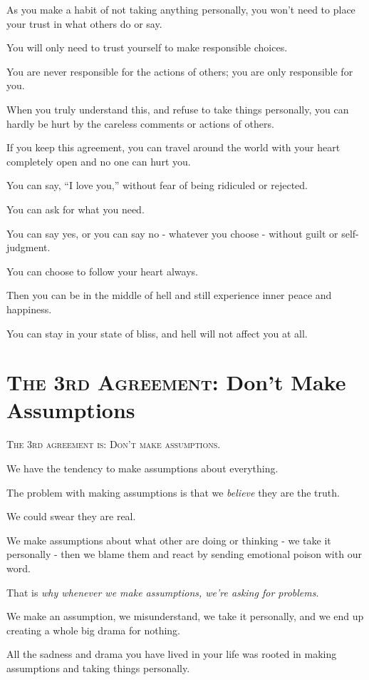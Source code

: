 \documentclass{article}
\numberwithin{equation}{section}
\begin{document}
%
As you make a habit of not taking anything personally, you won't need to place your trust in what others do or say.

You will only need to trust yourself to make responsible choices.

You are never responsible for the actions of others; you are only responsible for you.

When you truly understand this, and refuse to take things personally, you can hardly be hurt by the careless comments or actions of others.

%
If you keep this agreement, you can travel around the world with your heart completely open and no one can hurt you.

You can say, ``I love you,'' without fear of being ridiculed or rejected.

You can ask for what you need.

You can say yes, or you can say no - whatever you choose - without guilt or self-judgment.

You can choose to follow your heart always.

Then you can be in the middle of hell and still experience inner peace and happiness.

You can stay in your state of bliss, and hell will not affect you at all.

\section{\textsc{The 3rd Agreement}: Don't Make Assumptions}
\textsc{The 3rd agreement is: Don't make assumptions}.

%
We have the tendency to make assumptions about everything.

The problem with making assumptions is that we \textit{believe} they are the truth.

We could swear they are real.

We make assumptions about what other are doing or thinking - we take it personally - then we blame them and react by sending emotional poison with our word.

That is \textit{why whenever we make assumptions, we're asking for problems}.

We make an assumption, we misunderstand, we take it personally, and we end up creating a whole big drama for nothing.

%
All the sadness and drama you have lived in your life was rooted in making assumptions and taking things personally.
\end{document}
